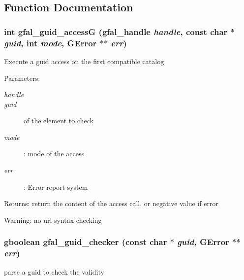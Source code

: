 \subsection{Function Documentation}
\subsubsection{\setlength{\rightskip}{0pt plus 5cm}int gfal\_\-guid\_\-access\-G (gfal\_\-handle {\em handle}, const char $\ast$ {\em guid}, int {\em mode}, GError $\ast$$\ast$ {\em err})}\label{gfal__common__guid_8c_55770e13f0626b60b830e3254df7ee9d}


Execute a guid access on the first compatible catalog \begin{Desc}
\item[Parameters:]
\begin{description}
\item[{\em handle}]\item[{\em guid}]of the element to check \item[{\em mode}]: mode of the access \item[{\em err}]: Error report system \end{description}
\end{Desc}
\begin{Desc}
\item[Returns:]return the content of the access call, or negative value if error \end{Desc}
\begin{Desc}
\item[Warning:]no url syntax checking \end{Desc}
\subsubsection{\setlength{\rightskip}{0pt plus 5cm}gboolean gfal\_\-guid\_\-checker (const char $\ast$ {\em guid}, GError $\ast$$\ast$ {\em err})}\label{gfal__common__guid_8c_9e4b6149b0256f725bc1dab5fc32ab62}


parse a guid to check the validity 
